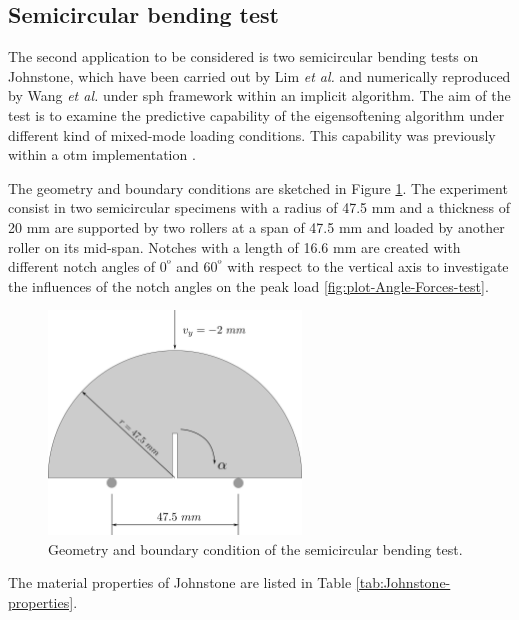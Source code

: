 \message{ !name(2020_EFM_MPM_Eigensoftening.tex)}\documentclass[preprint,12pt,a4paper]{elsarticle}
\begin{document}
\subsection{Semicircular bending test}
\label{sec:3.2}

The second application to be considered is two semicircular
bending tests on Johnstone, which have been carried out by Lim {\it et
  al.} \cite{LIM_1993} and numerically reproduced by Wang {\it et
  al.}\cite{Wang_2020} under \acrshort{sph} framework within an
implicit algorithm. The aim of the test is to examine the predictive
capability of the eigensoftening algorithm under different kind of
mixed-mode loading conditions. This capability was previously within a
\acrshort{otm} implementation \cite{Navas_2018_ES}.

The geometry and boundary conditions are sketched in Figure 
\ref{fig:geometry-Semicircular-bending-test}. The experiment consist in two
semicircular specimens with a radius of 47.5 mm and a thickness of
20 mm are supported by two rollers at a span of 47.5 mm and loaded by
another roller on its mid-span. Notches with a length of 16.6 mm are
created with different notch angles of 0$^º$ and 60$^º$ with respect
to the vertical axis to investigate the influences of the
notch angles on the peak load \ref{fig:plot-Angle-Forces-test}.
\begin{figure}
  \centering
  \includegraphics[width=0.6\textwidth]{./Figure-Semicircular-bending-test}
  \caption{Geometry and boundary condition of the semicircular bending
    test.}
  \label{fig:geometry-Semicircular-bending-test}
\end{figure}
The material properties of Johnstone are listed in Table \ref{tab:Johnstone-properties}.
\end{document}
